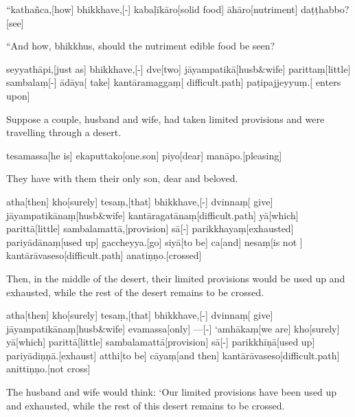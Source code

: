 \vskip 0.2in
\begin{samepage}
\begingl[glneveryline={\PaliGlossA,\PaliGlossB}]
“kathañca,[how] bhikkhave,[-] kabaḷīkāro[solid food] āhāro[nutriment] daṭṭhabbo?[see]
\endgl
\nopagebreak
\linespread{0.5}
\begin{spacin}{0.2}
{\PaliGlossFT “And how, bhikkhus, should the nutriment edible food be seen?}
\end{spacin}
\vskip 12pt
\end{samepage}
\begin{samepage}
\begingl[glneveryline={\PaliGlossA,\PaliGlossB}]
seyyathāpi,[just as] bhikkhave,[-] dve[two] jāyampatikā[husb\&wife] parittaṃ[little] sambalaṃ[-] ādāya[ take] kantāramaggaṃ[ difficult.path] paṭipajjeyyuṃ.[ enters upon]
\endgl
\nopagebreak
\linespread{0.5}
\begin{spacin}{0.2}
{\PaliGlossFT Suppose a couple, husband and wife, had taken limited provisions and were travelling through a desert.}
\end{spacin}
\vskip 12pt
\end{samepage}
\begin{samepage}
\begingl[glneveryline={\PaliGlossA,\PaliGlossB}]
tesamassa[he is] ekaputtako[one.son] piyo[dear] manāpo.[pleasing]
\endgl
\nopagebreak
\linespread{0.5}
\begin{spacin}{0.2}
{\PaliGlossFT They have with them their only son, dear and beloved.}
\end{spacin}
\vskip 12pt
\end{samepage}
\begin{samepage}
\begingl[glneveryline={\PaliGlossA,\PaliGlossB}]
atha[then] kho[surely] tesaṃ,[that] bhikkhave,[-] dvinnaṃ[ give] jāyampatikānaṃ[husb\&wife] kantāragatānaṃ[difficult.path] yā[which] parittā[little] sambalamattā,[provision] sā[-] parikkhayaṃ[exhausted] pariyādānaṃ[used up] gaccheyya.[go] siyā[to be] ca[and] nesaṃ[is not ] kantārāvaseso[difficult.path] anatiṇṇo.[crossed]
\endgl
\nopagebreak
\linespread{0.5}
\begin{spacin}{0.2}
{\PaliGlossFT Then, in the middle of the desert, their limited provisions would be used up and exhausted, while the rest of the desert remains to be crossed.}
\end{spacin}
\vskip 12pt
\end{samepage}
\begin{samepage}
\begingl[glneveryline={\PaliGlossA,\PaliGlossB}]
atha[then] kho[surely] tesaṃ,[that] bhikkhave,[-] dvinnaṃ[ give] jāyampatikānaṃ[husb\&wife] evamassa[only] —[-] ‘amhākaṃ[we are] kho[surely] yā[which] parittā[little] sambalamattā[provision] sā[-] parikkhīṇā[used up] pariyādiṇṇā.[exhaust] atthi[to be] cāyaṃ[and then] kantārāvaseso[difficult.path] anittiṇṇo.[not cross]
\endgl
\nopagebreak
\linespread{0.5}
\begin{spacin}{0.2}
{\PaliGlossFT The husband and wife would think: ‘Our limited provisions have been used up and exhausted, while the rest of this desert remains to be crossed.}
\end{spacin}
\vskip 12pt
\end{samepage}
